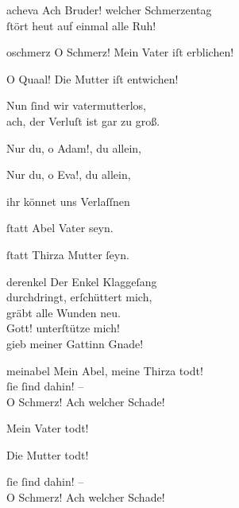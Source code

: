 \documentclass[tocstyle=ref-genre]{ees}
\begin{document}
{\begin{movement}{acheva}
  \voice[Sunam]
  Ach Bruder! welcher Schmerzentag\\
  ſtört heut auf einmal alle Ruh!
\end{movement}

\begin{movement}{oschmerz}
  \voice[Sunam]
  O Schmerz! Mein Vater iſt erblichen!

  \voice[Hamiel]
  O Quaal! Die Mutter iſt entwichen!

  \voice[beyde]
  Nun ſind wir vatermutterlos,\\
  ach, der Verluſt ist gar zu groß.

  \voice[Sunam]
  Nur du, o Adam!, du allein,

  \voice[Hamiel]
  Nur du, o Eva!, du allein,

  \voice[beyde]
  ihr könnet uns Verlaſſnen

  \voice[Sunam]
  ſtatt Abel Vater seyn.

  \voice[Hamiel]
  ſtatt Thirza Mutter ſeyn.
\end{movement}

\begin{movement}{derenkel}
  \voice[Adam]
  Der Enkel Klaggeſang\\
  durchdringt, erſchüttert mich,\\
  gräbt alle Wunden neu.\\
  Gott! unterſtütze mich!\\
  gieb meiner Gattinn Gnade!
\end{movement}

\begin{movement}{meinabel}
  \voice[Eva]
  Mein Abel, meine Thirza todt!\\
  ſie ſind dahin! –\\
  O Schmerz! Ach welcher Schade!

  \voice[Sunam]
  Mein Vater todt!

  \voice[Hamiel]
  Die Mutter todt!

  \voice[beyde]
  ſie ſind dahin! –\\
  O Schmerz! Ach welcher Schade!
\end{movement}


}

\eesScore
\end{document}
